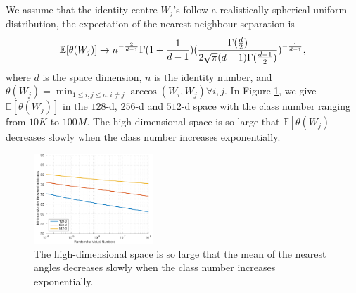 \documentclass[10pt,twocolumn,letterpaper]{article}
\begin{document}
We assume that the identity centre $W_j$'s follow a realistically spherical uniform distribution, the expectation of the nearest neighbour separation\cite{Brauchart18} is
\begin{equation}
\small
\mathbb{E}[\theta(W_j)]\rightarrow n^{-\frac{2}{d-1}}\Gamma(1+\frac{1}{d-1})(\frac{\Gamma(\frac{d}{2})}{2\sqrt{\pi}(d-1)\Gamma(\frac{d-1}{2})})^{-\frac{1}{d-1}},
\label{eq:largespace}
\end{equation}
where $d$ is the space dimension, $n$ is the identity number, and $\theta(W_j)=\min_{1\leq i,j\leq n, i\ne j}\arccos(W_i,W_j)\forall i,j$. In Figure \ref{fig:largespace}, we give $\mathbb{E}[\theta(W_j)]$ in the $128$-d, $256$-d and $512$-d space with the class number ranging from $10K$ to $100M$. The high-dimensional space is so large that $\mathbb{E}[\theta(W_j)]$ decreases slowly when the class number increases exponentially. 

\begin{figure}[ht!]
\centering
\includegraphics[width=0.4\textwidth]{image/largespace/minangledecrease.pdf}
\caption{The high-dimensional space is so large that the mean of the nearest angles decreases slowly when the class number increases exponentially.}
\vspace{-4mm}
\label{fig:largespace}
\end{figure}



{\small


}
\end{document}
